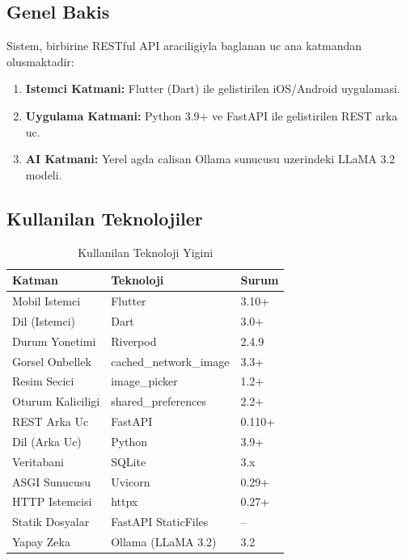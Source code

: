 \documentclass[conference]{IEEEtran}
\begin{document}
\subsection{Genel Bakis}

Sistem, birbirine RESTful API araciligiyla baglanan uc ana katmandan olusmaktadir:

\begin{enumerate}
  \item \textbf{Istemci Katmani:} Flutter (Dart) ile gelistirilen iOS/Android uygulamasi.
  \item \textbf{Uygulama Katmani:} Python 3.9+ ve FastAPI ile gelistirilen REST arka uc.
  \item \textbf{AI Katmani:} Yerel agda calisan Ollama sunucusu uzerindeki LLaMA 3.2 modeli.
\end{enumerate}

\subsection{Kullanilan Teknolojiler}

\begin{table}[h]
\caption{Kullanilan Teknoloji Yigini}
\label{tab:tech}
\centering
\begin{tabular}{lll}
\toprule
\textbf{Katman} & \textbf{Teknoloji} & \textbf{Surum} \\
\midrule
Mobil Istemci & Flutter & 3.10+ \\
Dil (Istemci) & Dart & 3.0+ \\
Durum Yonetimi & Riverpod & 2.4.9 \\
Gorsel Onbellek & cached\_network\_image & 3.3+ \\
Resim Secici & image\_picker & 1.2+ \\
Oturum Kaliciligi & shared\_preferences & 2.2+ \\
\midrule
REST Arka Uc & FastAPI & 0.110+ \\
Dil (Arka Uc) & Python & 3.9+ \\
Veritabani & SQLite & 3.x \\
ASGI Sunucusu & Uvicorn & 0.29+ \\
HTTP Istemcisi & httpx & 0.27+ \\
Statik Dosyalar & FastAPI StaticFiles & -- \\
\midrule
Yapay Zeka & Ollama (LLaMA 3.2) & 3.2 \\
\bottomrule
\end{tabular}
\end{table}
\end{document}

